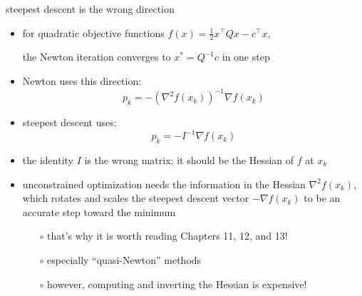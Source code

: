 \documentclass[10pt,hyperref]{beamer}
\newcommand{\grad}{\nabla}
\begin{document}
\begin{frame}{steepest descent is the wrong direction}

\begin{itemize}
\item for quadratic objective functions $f(x)=\frac{1}{2} x^\top Q x - c^\top x$,

\centerline{\alert{the Newton iteration converges to $x^*=Q^{-1}c$ in one step}}

\bigskip
\item Newton uses this direction:
    $$p_k = - \left(\grad^2 f(x_k)\right)^{-1} \grad f(x_k)$$
\item steepest descent uses:
    $$p_k = - I^{-1} \grad f(x_k)$$
\item \alert{the identity $I$ is the wrong matrix; it should be the Hessian of $f$ at $x_k$}

\bigskip
\item unconstrained optimization \alert{needs the information in the Hessian $\grad^2 f(x_k)$}, which rotates and scales the steepest descent vector $-\grad f(x_k)$ to be an accurate step toward the minimum
    \begin{itemize}
    \item[$\circ$] that's why it is worth reading Chapters 11, 12, and 13!
    \item[$\circ$] especially ``quasi-Newton'' methods
    \item[$\circ$] however, computing and inverting the Hessian is expensive!
    \end{itemize}
\end{itemize}
\end{frame}
\end{document}
